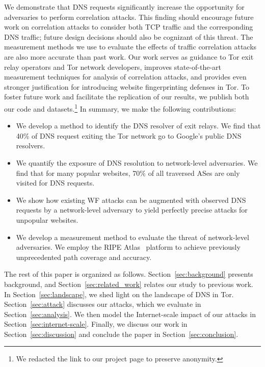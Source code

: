 We demonstrate that DNS requests significantly increase the opportunity
for adversaries to perform correlation attacks. This finding should
encourage future work on correlation attacks to consider both TCP
traffic and the corresponding DNS traffic; future design decisions
should also be cognizant of this threat.  The measurement methods we use
to evaluate the effects of traffic correlation attacks are also more
accurate than past work. Our work \first serves as guidance to Tor exit
relay operators and Tor network developers, \second improves
state-of-the-art measurement techniques for analysis of correlation attacks, and \third
provides even stronger justification for introducing website fingerprinting defenses in
Tor.  To foster future work and facilitate the replication of
our results, we publish both our code and datasets.\footnote{We redacted
  the link to our project page to preserve anonymity.} In
summary, we make the following contributions:
\begin{itemize}
\item We develop a method to identify the DNS resolver of exit
  relays. We find that 40\% of DNS request exiting the Tor network go to
  Google's public DNS resolvers.

	\item We quantify the exposure of DNS resolution to
		network-level adversaries.  We find that for many popular
		websites, 70\% of all traversed ASes are only visited for DNS requests.

	\item We show how existing WF attacks can be augmented with observed DNS
	requests by a network-level adversary to yield perfectly precise
	\name attacks for unpopular websites.

	\item We develop a measurement method to evaluate the threat of
		network-level adversaries. We employ the RIPE Atlas~\cite{atlas}
		platform to achieve previously unprecedented path coverage and accuracy.
\end{itemize}
\noindent
The rest of this paper is organized as follows.
Section~\ref{sec:background} presents background, and
Section~\ref{sec:related_work} relates our study to previous work.  In
Section~\ref{sec:landscape}, we shed light on the landscape of DNS in
Tor.  Section~\ref{sec:attack} discusses our \name attacks, which we
evaluate in Section~\ref{sec:analysis}.  We then model the
Internet-scale impact of our attacks in
Section~\ref{sec:internet-scale}.  Finally, we discuss our work in
Section~\ref{sec:discussion} and conclude the paper in
Section~\ref{sec:conclusion}.
